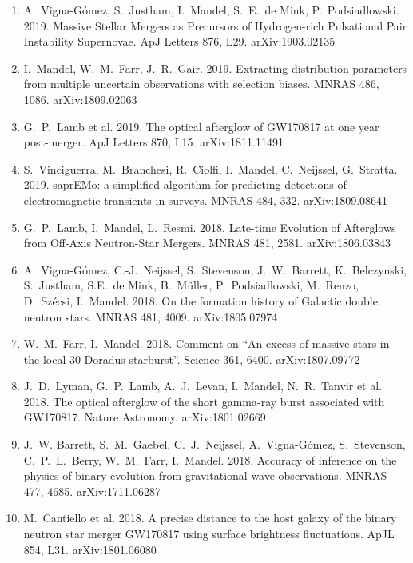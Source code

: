 \documentclass[margin,line]{res}
\begin{document}
\begin{resume}
\begin{enumerate}
\item A.~Vigna-G\'{o}mez, S.~Justham, I.~Mandel, S.~E.~de Mink, P.~Podsiadlowski.  2019.  Massive Stellar Mergers as Precursors of Hydrogen-rich Pulsational Pair Instability Supernovae.  ApJ Letters 876, L29. arXiv:1903.02135

\item I.~Mandel, W.~M.~Farr, J.~R.~Gair.  2019. Extracting distribution parameters from multiple uncertain observations with selection biases.  MNRAS 486, 1086.  arXiv:1809.02063

\item G.~P.~Lamb et al. 2019. The optical afterglow of GW170817 at one year post-merger.  ApJ Letters 870, L15. arXiv:1811.11491

\item S.~Vinciguerra, M.~Branchesi, R.~Ciolfi, I.~Mandel, C.~Neijssel, G.~Stratta.  2019. saprEMo: a simplified algorithm for predicting detections of electromagnetic transients in surveys.  MNRAS 484, 332.  arXiv:1809.08641

\item G.~P.~Lamb, I.~Mandel, L.~Resmi.  2018.  Late-time Evolution of Afterglows from Off-Axis Neutron-Star Mergers.  MNRAS 481, 2581.  arXiv:1806.03843

\item A.~Vigna-G\'{o}mez, C.-J.~Neijssel, S.~Stevenson, J.~W.~Barrett, K.~Belczynski, S.~Justham, S.E.~de Mink, B.~M{\"u}ller, P.~Podsiadlowski, M.~Renzo, D.~Sz{\'e}csi, I.~Mandel.  2018. On the formation history of Galactic double neutron stars.  MNRAS 481, 4009. arXiv:1805.07974

\item W.~M.~Farr, I.~Mandel.  2018.  Comment on ``An excess of massive stars in the local 30 Doradus starburst''.  Science 361, 6400.  arXiv:1807.09772

\item J.~D.~Lyman, G.~P.~Lamb, A.~J.~Levan, I.~Mandel, N.~R.~Tanvir et al.  2018. The optical afterglow of the short gamma-ray burst associated with GW170817.  Nature Astronomy. arXiv:1801.02669

\item J.~W. Barrett, S.~M.~Gaebel, C.~J.~Neijssel, A.~Vigna-G\'{o}mez, S.~Stevenson, C.~P.~L.~Berry, W.~M.~Farr, I.~Mandel.  2018.  Accuracy of inference on the physics of binary evolution from gravitational-wave observations.   MNRAS 477, 4685.  arXiv:1711.06287

\item M.~Cantiello et al. 2018.  A precise distance to the host galaxy of the binary neutron star merger GW170817 using surface brightness fluctuations.  ApJL 854, L31.  arXiv:1801.06080


\end{enumerate}
\end{resume}
\end{document}
